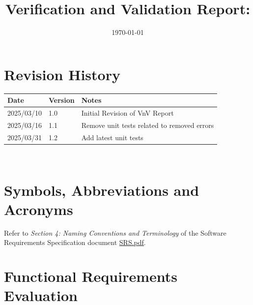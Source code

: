 \documentclass[12pt, titlepage]{article}
\begin{document}
\title{Verification and Validation Report: \progname}
\author{\authname}
\date{\today}

\maketitle


\section{Revision History}

\begin{tabularx}{\textwidth}{p{3cm}p{2cm}X}
  \toprule {\bf Date} & {\bf Version} & {\bf Notes}\\
  \midrule
  2025/03/10 & 1.0 & Initial Revision of VnV Report\\
  2025/03/16 & 1.1 & Remove unit tests related to removed errors\\
  2025/03/31 & 1.2 & Add latest unit tests\\
  \bottomrule
\end{tabularx}

~\newpage

\section{Symbols, Abbreviations and Acronyms}

Refer to \textit{Section 4: Naming Conventions and Terminology} of
the Software Requirements Specification document
\href{https://github.com/Spitgranger/SyncMaster/blob/main/docs/SRS-Volere/SRS.pdf}{SRS.pdf}.

\newpage

\tableofcontents

\listoftables %

\listoffigures %

\newpage


\section{Functional Requirements Evaluation}
\end{document}
